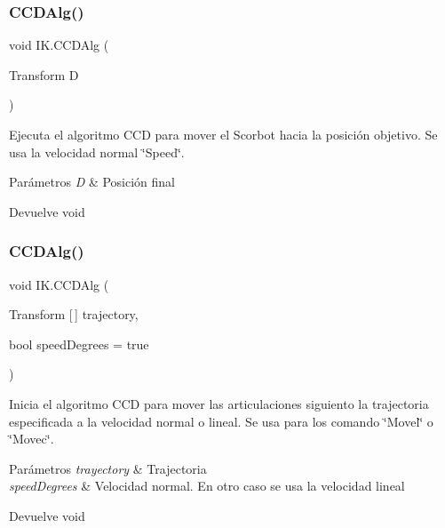 \subsubsection{\texorpdfstring{CCDAlg()}{CCDAlg()}\hspace{0.1cm}{\footnotesize\ttfamily [1/2]}}
{\footnotesize\ttfamily void I\+K.\+C\+C\+D\+Alg (\begin{DoxyParamCaption}\item[{Transform}]{D }\end{DoxyParamCaption})\hspace{0.3cm}{\ttfamily [inline]}}

Ejecuta el algoritmo C\+CD para mover el Scorbot hacia la posición objetivo. Se usa la velocidad normal \char`\"{}\+Speed\char`\"{}. 
\begin{DoxyParams}{Parámetros}
{\em D} & Posición final \\
\hline
\end{DoxyParams}
\begin{DoxyReturn}{Devuelve}
void 
\end{DoxyReturn}
\mbox{\label{class_i_k_a647580fce8d20924d081e6c056495e95}} 
\subsubsection{\texorpdfstring{CCDAlg()}{CCDAlg()}\hspace{0.1cm}{\footnotesize\ttfamily [2/2]}}
{\footnotesize\ttfamily void I\+K.\+C\+C\+D\+Alg (\begin{DoxyParamCaption}\item[{Transform \mbox{[}$\,$\mbox{]}}]{trajectory,  }\item[{bool}]{speed\+Degrees = {\ttfamily true} }\end{DoxyParamCaption})\hspace{0.3cm}{\ttfamily [inline]}}

Inicia el algoritmo C\+CD para mover las articulaciones siguiento la trajectoria especificada a la velocidad normal o lineal. Se usa para los comando \char`\"{}\+Movel\char`\"{} o \char`\"{}\+Movec\char`\"{}. 
\begin{DoxyParams}{Parámetros}
{\em trayectory} & Trajectoria \\
\hline
{\em speed\+Degrees} & Velocidad normal. En otro caso se usa la velocidad lineal \\
\hline
\end{DoxyParams}
\begin{DoxyReturn}{Devuelve}
void 
\end{DoxyReturn}
\mbox{\label{class_i_k_a013718309a8051f89d0865803f2d54e6}} 
